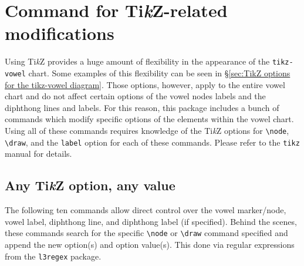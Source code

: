 \documentclass{article}
\newcommand{\TikZ}{Ti\textit{k}Z\xspace}
\newcommand{\pkg}[1]{\texttt{#1}}
\begin{document}
\section{Command for \TikZ-related modifications}
\label{sec:Command for TikZ-related modifications}

Using \TikZ provides a huge amount of flexibility in the appearance of the \texttt{tikz-vowel} chart.  Some examples of this flexibility can be seen in \S \ref{sec:TikZ options for the tikz-vowel diagram}.  Those options, however, apply to the entire vowel chart and do not affect certain options of the vowel nodes labels and the diphthong lines and labels.  For this reason, this package includes a bunch of commands which modify specific options of the elements within the vowel chart.  Using all of these commands requires knowledge of the \TikZ options for \verb|\node|, \verb|\draw|, and the \texttt{label} option for each of these commands.  Please refer to the \pkg{tikz} manual for details.

\subsection{Any \TikZ option, any value}
\label{sec:Any TikZ option, any value}

The following ten commands allow direct control over the vowel marker/node, vowel label, diphthong line, and diphthong label (if specified).  Behind the scenes, these commands search for the specific \verb|\node| or \verb|\draw| command specified and append the new option(s) and option value(s).  This done via regular expressions from the \pkg{l3regex} package.
\end{document}
